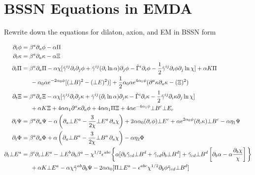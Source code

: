\documentclass[%
 reprint,
 amsmath,amssymb,
 aps,
]{revtex4-1}
\begin{document}
\section{BSSN Equations in EMDA}
Rewrite down the equations for dilaton, axion, and EM in BSSN form 
\begin{widetext}
\begin{align}
\partial_t \phi &= \beta^a \partial_a \phi - \alpha \Pi \\
\partial_t \kappa &= \beta^a \partial_a \kappa - \alpha \Xi  \\
\partial_t \Pi &= \beta^a \partial_a \Pi - \alpha \chi [ \tilde{\gamma}^{ij} \partial_i \partial_j \phi +   \tilde{\gamma}^{ij} (\partial_i \ln \alpha) \partial_j \phi -  \tilde{\Gamma}^i \partial_i \phi - \frac{1}{2} \tilde{\gamma}^{ij} \partial_i \phi \partial_j \ln \chi ] + \alpha K \Pi  \nonumber \\
		   &\indent -\alpha_0 \alpha e^{-2 \alpha_0 \phi}  [ (\bot B)^2 - (\bot E)^2)] + \frac{1}{2} \alpha_0 \alpha e^{4 \alpha_1 \phi} (\partial^a \kappa \partial_a \kappa - (\Xi)^2)  \\
\partial_t \Xi &= \beta^a \partial_a \Xi - \alpha \chi [ \tilde{\gamma}^{ij} \partial_i \partial_j \kappa +   \tilde{\gamma}^{ij} (\partial_i \ln \alpha) \partial_j \kappa -  \tilde{\Gamma}^i \partial_i \kappa - \frac{1}{2} \tilde{\gamma}^{ij} \partial_i \kappa \partial_j \ln \chi ] \nonumber \\
&\indent +  \alpha K \Xi +4 \alpha \alpha_1 \partial^a \kappa \partial_a \phi + 4 \alpha \alpha_1 \Pi \Xi + 4 \alpha e^{-4 \alpha_1 \phi} \bot B^c \bot E_c \\
\partial_t \Psi &= \beta^a \partial_a \Psi - \alpha \left(\partial_a \bot E^a - \frac{3}{2 \chi}  \bot E^a \, \partial_a \chi \right) + 2 \alpha  \alpha_0 (\partial_c \phi) \bot E^c + \alpha  e^{2 \alpha_0 \phi} (\partial_c \kappa) \bot B^c  - \alpha \eta_1 \Psi \\
\partial_t \Phi &=  \beta^a \partial_a \Phi +\alpha \left(\partial_a \bot B^a - \frac{3}{2 \chi} \bot B^a \, \partial_a \chi  \right)  - \alpha  \eta_2 \Phi \\
\partial_t \bot E^a &= \beta^i \partial_i \bot E^a - \bot E^b \partial_b \beta^a - \chi^{1/2} \epsilon^{abc} \bigg \{ \alpha [\partial_b \tilde{\gamma}_{cd} \bot B^d + \tilde{\gamma}_{cd} \partial_b \bot B^d] + \tilde{\gamma}_{cd} \bot B^d \left[ \partial_b \alpha - \alpha \frac{\partial_b \chi}{\chi} \right] \bigg \} \nonumber \\
			    & \indent + \alpha K \bot E^a - \alpha \chi \tilde{\gamma}^{ab} \partial_b \Psi - 2 \alpha \alpha_0 [ \Pi \bot E^a - \epsilon^{abc} \chi^{1/2} \partial_b \phi \tilde{\gamma}_{cd} \bot B^d] \nonumber \\

\end{align}
\end{widetext}
\end{document}
